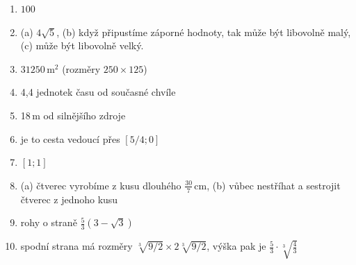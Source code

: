 \documentclass[12pt,a4paper]{article}
\theoremstyle{definition}
\newtheorem{uloha}{Úloha}
\begin{document}
\begin{enumerate}%
	\item $100$
	\item (a) $4 \sqrt5$, (b) když připustíme záporné hodnoty, tak může být libovolně malý, (c) může být libovolně velký.
	\item $31250\,$m$^2$ (rozměry $250\times 125$)
	\item 4,4 jednotek času od současné chvíle
	\item 18\,m od silnějšího zdroje
	\item je to cesta vedoucí přes $[5/4; 0]$
	\item $[1; 1]$
	\item (a) čtverec vyrobíme z kusu dlouhého $\frac{30}{7}$\,cm, (b) vůbec nestříhat a sestrojit čtverec z jednoho kusu
	\item rohy o straně $\frac{5}{3} \left(3-\sqrt{3}\right)$
	\item spodní strana má rozměry $\sqrt[3]{9/2} \times 2\sqrt[3]{9/2}$, výška pak je $\frac53 \cdot \sqrt[3]{\frac43}$
\end{enumerate}
%
%
%
\end{document}
